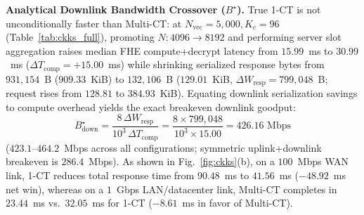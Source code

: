 \documentclass[10pt,journal,compsoc]{IEEEtran}
\begin{document}
\smallskip\noindent \textbf{Analytical Downlink Bandwidth Crossover ($B^\star$).} True 1-CT is not unconditionally faster than Multi-CT: at $N_{\text{vec}}=5{,}000, K_c=96$ (Table~\ref{tab:ckks_full}), promoting $N: 4096 \to 8192$ and performing server slot aggregation raises median FHE compute+decrypt latency from $15.99$~ms to $30.99$~ms ($\Delta T_{\text{comp}} = +15.00$~ms) while shrinking serialized response bytes from $931{,}154$~B ($909.33$~KiB) to $132{,}106$~B ($129.01$~KiB, $\Delta W_{\text{resp}} = 799{,}048$~B; request rises from $128.81$ to $384.93$~KiB). Equating downlink serialization savings to compute overhead yields the exact breakeven downlink goodput:
\begin{equation}
B^\star_{\text{down}} = \frac{8\,\Delta W_{\text{resp}}}{10^3\,\Delta T_{\text{comp}}} = \frac{8 \times 799{,}048}{10^3 \times 15.00} = 426.16\text{~Mbps} \label{eq:bstar}
\end{equation}
($423.1\text{--}464.2$~Mbps across all configurations; symmetric uplink+downlink breakeven is $286.4$~Mbps). As shown in Fig.~\ref{fig:ckks}(b), on a $100$~Mbps WAN link, 1-CT reduces total response time from $90.48$~ms to $41.56$~ms ($-48.92$~ms net win), whereas on a $1$~Gbps LAN/datacenter link, Multi-CT completes in $23.44$~ms vs.\ $32.05$~ms for 1-CT ($-8.61$~ms in favor of Multi-CT).
\end{document}
